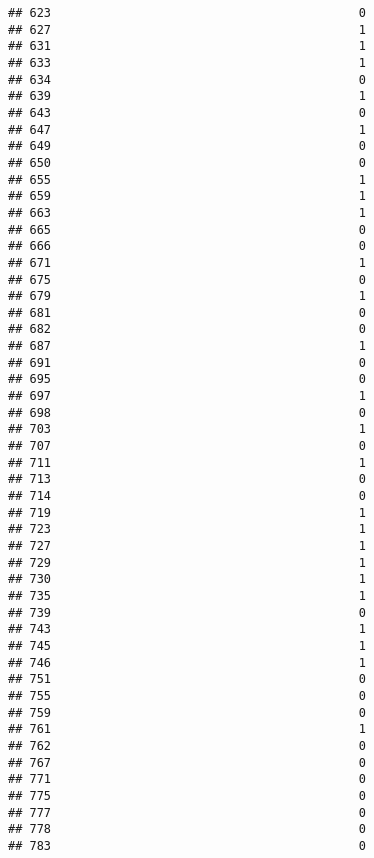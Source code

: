 \documentclass[
]{article}
\begin{document}
\begin{verbatim}
## 623                                           0
## 627                                           1
## 631                                           1
## 633                                           1
## 634                                           0
## 639                                           1
## 643                                           0
## 647                                           1
## 649                                           0
## 650                                           0
## 655                                           1
## 659                                           1
## 663                                           1
## 665                                           0
## 666                                           0
## 671                                           1
## 675                                           0
## 679                                           1
## 681                                           0
## 682                                           0
## 687                                           1
## 691                                           0
## 695                                           0
## 697                                           1
## 698                                           0
## 703                                           1
## 707                                           0
## 711                                           1
## 713                                           0
## 714                                           0
## 719                                           1
## 723                                           1
## 727                                           1
## 729                                           1
## 730                                           1
## 735                                           1
## 739                                           0
## 743                                           1
## 745                                           1
## 746                                           1
## 751                                           0
## 755                                           0
## 759                                           0
## 761                                           1
## 762                                           0
## 767                                           0
## 771                                           0
## 775                                           0
## 777                                           0
## 778                                           0
## 783                                           0

\end{verbatim}
\end{document}
